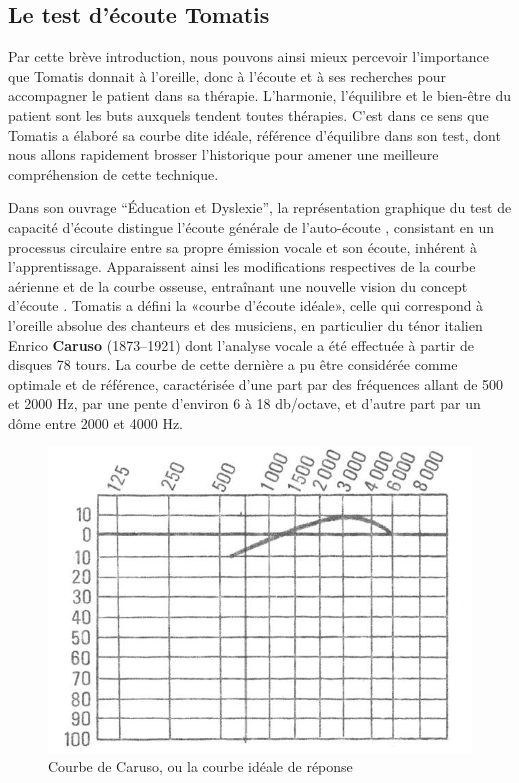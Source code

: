 
\subsection{Le test d'écoute Tomatis}
Par cette brève introduction, nous pouvons ainsi mieux percevoir l'importance que Tomatis donnait à l'oreille, donc à l'écoute et à ses recherches pour accompagner le patient dans sa thérapie.
L'harmonie, l'équilibre et le bien-être du patient sont les buts auxquels tendent  toutes thérapies. C'est 
dans ce sens que Tomatis a élaboré sa courbe dite idéale, référence d'équilibre dans son test, dont nous 
allons rapidement brosser l'historique pour amener une meilleure compréhension de cette technique.

Dans son ouvrage ``Éducation et
    Dyslexie''\autocite {tomatis:education}, la représentation graphique du
 test de capacité d'écoute distingue l'écoute générale de
 l'auto-écoute \autocite {Tomatislangage}, consistant  en un processus
   circulaire entre sa propre  émission vocale et son écoute, inhérent
   à l'apprentissage.
 Apparaissent ainsi les modifications respectives
 de la courbe aérienne et de la courbe osseuse, entraînant une nouvelle vision
 du concept d'écoute \autocite {tomatis_conf}.%
       Tomatis a défini la «courbe d'écoute idéale», celle qui correspond à l'oreille absolue
des chanteurs et des musiciens, en particulier du ténor italien Enrico
\textbf{Caruso} (1873--1921) dont l'analyse vocale a été effectuée à partir de
disques 78 tours. 
La courbe de cette dernière a pu être considérée comme
optimale et de référence, caractérisée d'une part par des fréquences allant de 500 et 2000
Hz, par une pente d\textquoteright environ 6 à 18 db/octave,
et d'autre part par un dôme entre 2000 et 4000 Hz.

\begin{center}
	\begin{figure}
		\includegraphics[width=0.7\linewidth]{images/graphiques/courbecarusoideale}	
		\caption{Courbe de Caruso, ou la courbe idéale de réponse \autocite{Tomatislangage} }
	\end{figure}	
\end{center}



